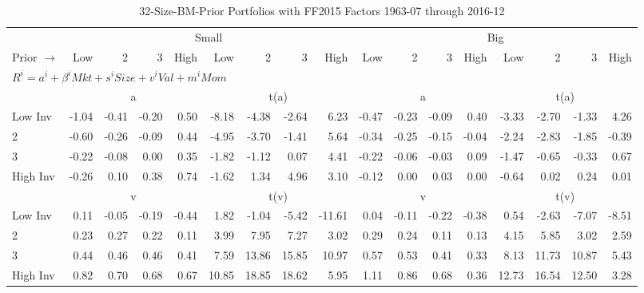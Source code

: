 
\begin{table}[!ht]
\footnotesize
\centering
\caption{32-Size-BM-Prior Portfolios with FF2015 Factors 1963-07 through 2016-12}
\begin{tabular}{lrrrrrrrrrrrrrrrr}
  \toprule
    & \multicolumn{8}{c}{Small} & \multicolumn{8}{c}{Big} \\
      \cmidrule(r){2-9} \cmidrule(r){10-17}
    Prior $\rightarrow$ & Low & 2 & 3 & High & Low & 2 & 3 & High & Low & 2 & 3 & High & Low & 2 & 3 & High \\ 
  \midrule
  \multicolumn{17}{l}{$R^i=a^i+\beta^iMkt+s^iSize+v^iVal+m^iMom$} \\

  
    
      & \multicolumn{4}{c}{a} & \multicolumn{4}{c}{t(a)}
    
      & \multicolumn{4}{c}{a} & \multicolumn{4}{c}{t(a)}
    
    \\
      \cmidrule(r){2-5} \cmidrule(r){6-9} \cmidrule(r){10-13} \cmidrule(r){14-17}

    Low Inv   & -1.04  & -0.41  & -0.20  & 0.50  & -8.18  & -4.38  & -2.64  & 6.23  & -0.47  & -0.23  & -0.09  & 0.40  & -3.33  & -2.70  & -1.33  & 4.26  \\
           2  & -0.60  & -0.26  & -0.09  & 0.44  & -4.95  & -3.70  & -1.41  & 5.64  & -0.34  & -0.25  & -0.15  & -0.04  & -2.24  & -2.83  & -1.85  & -0.39  \\
           3  & -0.22  & -0.08  & 0.00  & 0.35  & -1.82  & -1.12  & 0.07  & 4.41  & -0.22  & -0.06  & -0.03  & 0.09  & -1.47  & -0.65  & -0.33  & 0.67  \\
    High Inv  & -0.26  & 0.10  & 0.38  & 0.74  & -1.62  & 1.34  & 4.96  & 3.10  & -0.12  & 0.00  & 0.03  & 0.00  & -0.64  & 0.02  & 0.24  & 0.01  \\

  
    
      & \multicolumn{4}{c}{v} & \multicolumn{4}{c}{t(v)}
    
      & \multicolumn{4}{c}{v} & \multicolumn{4}{c}{t(v)}
    
    \\
      \cmidrule(r){2-5} \cmidrule(r){6-9} \cmidrule(r){10-13} \cmidrule(r){14-17}

    Low Inv   & 0.11  & -0.05  & -0.19  & -0.44  & 1.82  & -1.04  & -5.42  & -11.61  & 0.04  & -0.11  & -0.22  & -0.38  & 0.54  & -2.63  & -7.07  & -8.51  \\
           2  & 0.23  & 0.27  & 0.22  & 0.11  & 3.99  & 7.95  & 7.27  & 3.02  & 0.29  & 0.24  & 0.11  & 0.13  & 4.15  & 5.85  & 3.02  & 2.59  \\
           3  & 0.44  & 0.46  & 0.46  & 0.41  & 7.59  & 13.86  & 15.85  & 10.97  & 0.57  & 0.53  & 0.41  & 0.33  & 8.13  & 11.73  & 10.87  & 5.43  \\
    High Inv  & 0.82  & 0.70  & 0.68  & 0.67  & 10.85  & 18.85  & 18.62  & 5.95  & 1.11  & 0.86  & 0.68  & 0.36  & 12.73  & 16.54  & 12.50  & 3.28  \\


\end{tabular}
\end{table}
